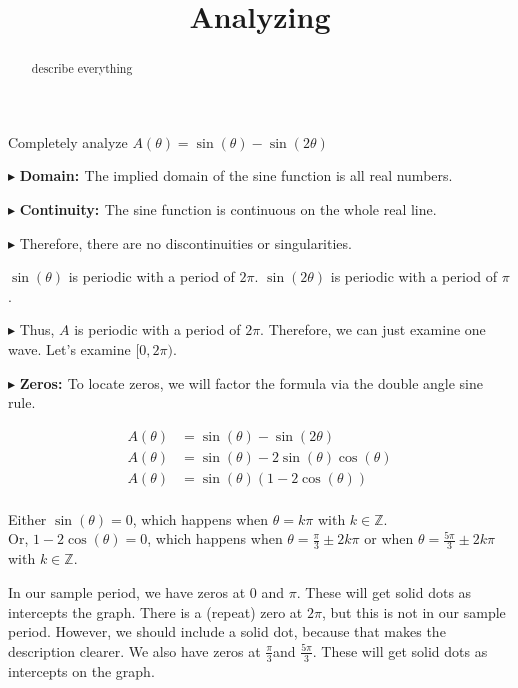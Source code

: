 \documentclass{ximera}
\title{Analyzing}
\begin{document}
\begin{abstract}
describe everything
\end{abstract}
\maketitle







Completely analyze $A(\theta) = \sin(\theta) - \sin(2\theta)$

$\blacktriangleright$  \textbf{\textcolor{blue!55!black}{Domain: }} The implied domain of the sine function is all real numbers.

$\blacktriangleright$ \textbf{\textcolor{blue!55!black}{Continuity: }}  The sine function is continuous on the whole real line.

$\blacktriangleright$  Therefore, there are no discontinuities or singularities.


$\sin(\theta)$ is periodic with a period of $2\pi$. $\sin(2\theta)$ is periodic with a period of $\pi$. 

$\blacktriangleright$ Thus, $A$ is periodic with a period of $2\pi$.  Therefore, we can just examine one wave.  Let's examine $[0,2\pi)$.






$\blacktriangleright$ \textbf{\textcolor{blue!55!black}{Zeros: }} To locate zeros, we will factor the formula via the double angle sine rule.  




\begin{align*}
A(\theta)   &  = \sin(\theta) - \sin(2\theta)  \\
A(\theta)   &  = \sin(\theta) - 2\sin(\theta)\cos(\theta)   \\
A(\theta)   &  = \sin(\theta) (1 - 2\cos(\theta))   \\
\end{align*}



Either $\sin(\theta) = 0$, which happens when $\theta = k\pi$ with $k \in \mathbb{Z}$. \\
Or, $1 - 2\cos(\theta) = 0$, which happens when $\theta = \frac{\pi}{3} \pm 2k\pi$ or when $\theta = \frac{5\pi}{3} \pm 2k\pi$ with $k \in \mathbb{Z}$.

In our sample period, we have zeros at $0$ and $\pi$. These will get solid dots as intercepts the graph.  There is a (repeat) zero at $2\pi$, but this is not in our sample period.  However, we should include a solid dot, because that makes the description clearer.  We also have zeros at $\frac{\pi}{3}$and $\frac{5\pi}{3}$.  These will get solid dots as intercepts on the graph.
\end{document}
